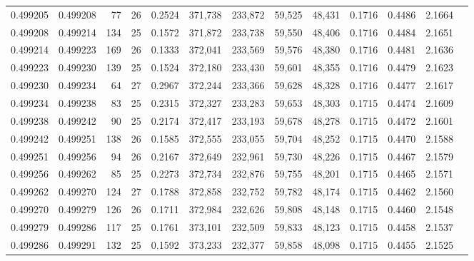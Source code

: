 \begin{tabular}{rrrrrrrrrrrrr}
0.499205 & 0.499208 &  77 &  26 &                                     0.2524 & 371,738 & 233,872 &  59,525 &  48,431 & 0.1716 & 0.4486 & 2.1664 \\
0.499208 & 0.499214 & 134 &  25 &                                     0.1572 & 371,872 & 233,738 &  59,550 &  48,406 & 0.1716 & 0.4484 & 2.1651 \\
0.499214 & 0.499223 & 169 &  26 &                                     0.1333 & 372,041 & 233,569 &  59,576 &  48,380 & 0.1716 & 0.4481 & 2.1636 \\
0.499223 & 0.499230 & 139 &  25 &                                     0.1524 & 372,180 & 233,430 &  59,601 &  48,355 & 0.1716 & 0.4479 & 2.1623 \\
0.499230 & 0.499234 &  64 &  27 &                                     0.2967 & 372,244 & 233,366 &  59,628 &  48,328 & 0.1716 & 0.4477 & 2.1617 \\
0.499234 & 0.499238 &  83 &  25 &                                     0.2315 & 372,327 & 233,283 &  59,653 &  48,303 & 0.1715 & 0.4474 & 2.1609 \\
0.499238 & 0.499242 &  90 &  25 &                                     0.2174 & 372,417 & 233,193 &  59,678 &  48,278 & 0.1715 & 0.4472 & 2.1601 \\
0.499242 & 0.499251 & 138 &  26 &                                     0.1585 & 372,555 & 233,055 &  59,704 &  48,252 & 0.1715 & 0.4470 & 2.1588 \\
0.499251 & 0.499256 &  94 &  26 &                                     0.2167 & 372,649 & 232,961 &  59,730 &  48,226 & 0.1715 & 0.4467 & 2.1579 \\
0.499256 & 0.499262 &  85 &  25 &                                     0.2273 & 372,734 & 232,876 &  59,755 &  48,201 & 0.1715 & 0.4465 & 2.1571 \\
0.499262 & 0.499270 & 124 &  27 &                                     0.1788 & 372,858 & 232,752 &  59,782 &  48,174 & 0.1715 & 0.4462 & 2.1560 \\
0.499270 & 0.499279 & 126 &  26 &                                     0.1711 & 372,984 & 232,626 &  59,808 &  48,148 & 0.1715 & 0.4460 & 2.1548 \\
0.499279 & 0.499286 & 117 &  25 &                                     0.1761 & 373,101 & 232,509 &  59,833 &  48,123 & 0.1715 & 0.4458 & 2.1537 \\
0.499286 & 0.499291 & 132 &  25 &                                     0.1592 & 373,233 & 232,377 &  59,858 &  48,098 & 0.1715 & 0.4455 & 2.1525 \\

\end{tabular}
